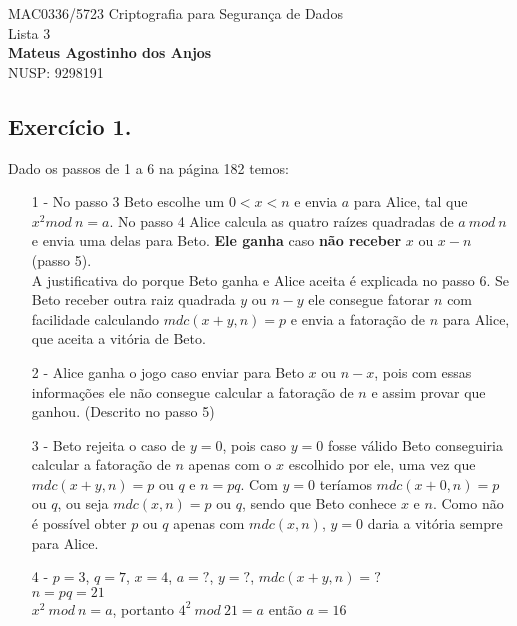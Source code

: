 \documentclass[12pt]{article}
\begin{document}
	\begin{center}
		{\Large MAC0336/5723 Criptografia para Segurança de Dados\\
		Lista 3}\\
		\textbf{Mateus Agostinho dos Anjos}\\
		NUSP: 9298191
	\end{center}

	\vspace{0.4 cm}
	
	\subsection*{Exercício 1.}
		Dado os passos de 1 a 6 na página 182 temos:
		\begin{itemize}			
			\item[1 -]
				No passo 3 Beto escolhe um $0 < x < n$ e envia $a$ para
				Alice, tal que $x^2 mod \ n = a$. No passo 4 Alice calcula as 
				quatro raízes quadradas de $a \ mod \ n$ e envia uma delas 
				para Beto. \textbf{Ele ganha} caso \textbf{não receber} $x$ ou 
				$x - n$ (passo 5).\\
				A justificativa do porque Beto ganha e Alice aceita é explicada
				no passo 6. Se Beto receber outra raiz quadrada $y$ ou
				$n - y$ ele consegue fatorar $n$ com facilidade calculando
				$mdc(x+y, n) = p$ e envia a fatoração de $n$ para Alice, que
				aceita a vitória de Beto.
			\item[2 -]
				Alice ganha o jogo caso enviar para Beto $x$ ou $n - x$, pois
				com essas informações ele não consegue calcular a fatoração
				de $n$ e assim provar que ganhou. (Descrito no passo 5)
			\item[3 -]		
				Beto rejeita o caso de $y = 0$, pois caso $y = 0$ fosse válido
				Beto conseguiria calcular a fatoração de $n$ apenas com
				o $x$ escolhido por ele, uma vez que $mdc(x+y, n) = p$ ou $q$ e 
				$n = pq$. Com $y = 0$ teríamos $mdc(x+0, n) = p$ ou $q$, ou
				seja $mdc(x, n) = p$ ou $q$, sendo que Beto conhece $x$ e $n$.
				Como não é possível obter $p$ ou $q$ apenas com $mdc(x, n)$,
				$y = 0$ daria a vitória sempre para Alice.
			\item[4 -]
				$p = 3$, $q = 7$, $x = 4$, $a = ?$, $y = ?$, $mdc(x + y, n) = ?$\\
				$n = pq = 21$\\
				$x^2 \ mod \ n = a$, portanto $4^2 \ mod \ 21  = a$ então $a =  16$
				\newline
				\begin{center}

\end{center}
\end{itemize}
\end{document}
